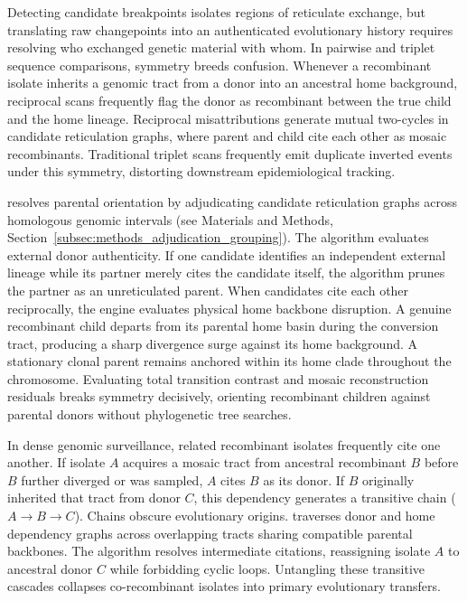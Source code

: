 Detecting candidate breakpoints isolates regions of reticulate exchange, but translating raw changepoints into an authenticated evolutionary history requires resolving who exchanged genetic material with whom.
In pairwise and triplet sequence comparisons, symmetry breeds confusion.
Whenever a recombinant isolate inherits a genomic tract from a donor into an ancestral home background, reciprocal scans frequently flag the donor as recombinant between the true child and the home lineage.
Reciprocal misattributions generate mutual two-cycles in candidate reticulation graphs, where parent and child cite each other as mosaic recombinants.
Traditional triplet scans frequently emit duplicate inverted events under this symmetry, distorting downstream epidemiological tracking.

\RhizAeon resolves parental orientation by adjudicating candidate reticulation graphs across homologous genomic intervals (see Materials and Methods, Section~\ref{subsec:methods_adjudication_grouping}).
The algorithm evaluates external donor authenticity.
If one candidate identifies an independent external lineage while its partner merely cites the candidate itself, the algorithm prunes the partner as an unreticulated parent.
When candidates cite each other reciprocally, the engine evaluates physical home backbone disruption.
A genuine recombinant child departs from its parental home basin during the conversion tract, producing a sharp divergence surge against its home background.
A stationary clonal parent remains anchored within its home clade throughout the chromosome.
Evaluating total transition contrast and mosaic reconstruction residuals breaks symmetry decisively, orienting recombinant children against parental donors without phylogenetic tree searches.

In dense genomic surveillance, related recombinant isolates frequently cite one another.
If isolate $A$ acquires a mosaic tract from ancestral recombinant $B$ before $B$ further diverged or was sampled, $A$ cites $B$ as its donor.
If $B$ originally inherited that tract from donor $C$, this dependency generates a transitive chain ($A \to B \to C$).
Chains obscure evolutionary origins.
\RhizAeon traverses donor and home dependency graphs across overlapping tracts sharing compatible parental backbones.
The algorithm resolves intermediate citations, reassigning isolate $A$ to ancestral donor $C$ while forbidding cyclic loops.
Untangling these transitive cascades collapses co-recombinant isolates into primary evolutionary transfers.

